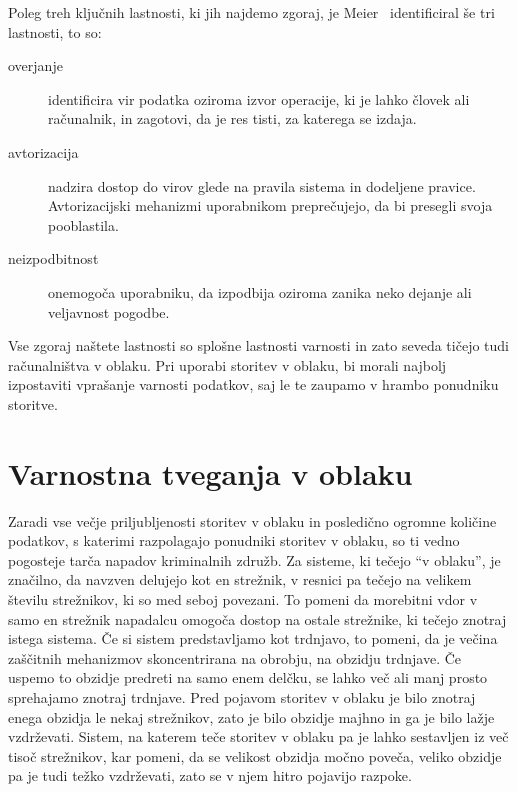 \documentclass[12pt,a4paper,openany,tikz]{book}
\theoremstyle{plain}
\theoremstyle{definition}
\begin{document}
Poleg treh ključnih lastnosti, ki jih najdemo zgoraj, je Meier~\cite{meier2003improving} identificiral še tri lastnosti, to so:

\begin{description}

\item[\Gls{overjanje}] identificira vir podatka oziroma izvor operacije, ki je lahko človek ali računalnik, in zagotovi, da je res tisti, za katerega se izdaja.

\item[\Gls{avtorizacija}] nadzira dostop do virov glede na pravila sistema in dodeljene pravice. Avtorizacijski mehanizmi uporabnikom preprečujejo, da bi presegli svoja pooblastila.

\item[\Gls{neizpodbitnost}] onemogoča uporabniku, da izpodbija oziroma zanika neko dejanje ali veljavnost pogodbe.

\end{description}

Vse zgoraj naštete lastnosti so splošne lastnosti varnosti in zato seveda tičejo tudi računalništva v oblaku. Pri uporabi storitev v oblaku, bi morali najbolj izpostaviti vprašanje varnosti podatkov, saj le te zaupamo v hrambo ponudniku storitve.

\chapter{Varnostna tveganja v oblaku}

Zaradi vse večje priljubljenosti storitev v oblaku in posledično ogromne količine podatkov, s katerimi razpolagajo ponudniki storitev v oblaku, so ti vedno pogosteje tarča napadov kriminalnih združb. Za sisteme, ki tečejo “v oblaku”, je značilno, da navzven delujejo kot en strežnik, v resnici pa tečejo na velikem številu strežnikov, ki so med seboj povezani. To pomeni da morebitni vdor v samo en strežnik napadalcu omogoča dostop na ostale strežnike, ki tečejo znotraj istega sistema. Če si sistem predstavljamo kot trdnjavo, to pomeni, da je večina zaščitnih mehanizmov skoncentrirana na obrobju, na obzidju trdnjave. Če uspemo to obzidje predreti na samo enem delčku, se lahko več ali manj prosto sprehajamo znotraj trdnjave. Pred pojavom storitev v oblaku je bilo znotraj enega obzidja le nekaj strežnikov, zato je bilo obzidje majhno in ga je bilo lažje vzdrževati. Sistem, na katerem teče storitev v oblaku pa je lahko sestavljen iz več tisoč strežnikov, kar pomeni, da se velikost obzidja močno poveča, veliko obzidje pa je tudi težko vzdrževati, zato se v njem hitro pojavijo razpoke.
\end{document}
